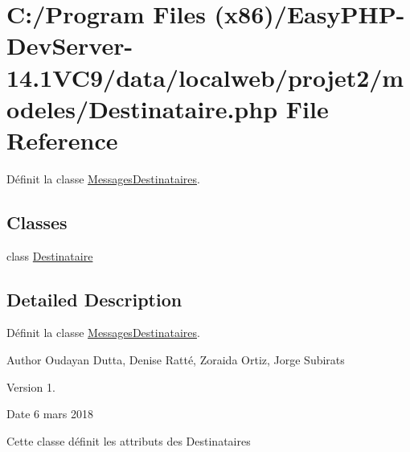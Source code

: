 \hypertarget{_destinataire_8php}{}\section{C\+:/\+Program Files (x86)/\+Easy\+P\+H\+P-\/\+Dev\+Server-\/14.1\+V\+C9/data/localweb/projet2/modeles/\+Destinataire.php File Reference}
\label{_destinataire_8php}


Définit la classe \hyperlink{class_messages_destinataires}{Messages\+Destinataires}.  


\subsection*{Classes}
\begin{DoxyCompactItemize}
\item 
class \hyperlink{class_destinataire}{Destinataire}
\end{DoxyCompactItemize}


\subsection{Detailed Description}
Définit la classe \hyperlink{class_messages_destinataires}{Messages\+Destinataires}. 

\begin{DoxyAuthor}{Author}
Oudayan Dutta, Denise Ratté, Zoraida Ortiz, Jorge Subirats 
\end{DoxyAuthor}
\begin{DoxyVersion}{Version}
1. 
\end{DoxyVersion}
\begin{DoxyDate}{Date}
6 mars 2018
\end{DoxyDate}
Cette classe définit les attributs des Destinataires 